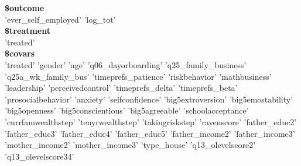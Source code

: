\textbf{\$outcome} \\
 \mbox{'ever\_self\_employed'} \hspace{6pt} \mbox{'log\_tot'}\\


\textbf{\$treatment}\\ 
\mbox{'treated'}
\\

\textbf{\$covars} \\
 \mbox{'treated'} \hspace{6pt}
 \mbox{'gender'} \hspace{6pt}
 \mbox{'age'} \hspace{6pt}
 \mbox{'q06\_dayorboarding'} \hspace{6pt}
 \mbox{'q25\_family\_business'} \hspace{6pt}
 \mbox{'q25a\_wk\_family\_bus'} \hspace{6pt}
 \mbox{'timeprefs\_patience'} \hspace{6pt}
 \mbox{'riskbehavior'} \hspace{6pt}
 \mbox{'mathbusiness'} \hspace{6pt}
 \mbox{'leadership'} \hspace{6pt}
 \mbox{'perceivedcontrol'} \hspace{6pt}
 \mbox{'timeprefs\_delta'} \hspace{6pt}
 \mbox{'timeprefs\_beta'} \hspace{6pt}
 \mbox{'prosocialbehavior'} \hspace{6pt}
 \mbox{'anxiety'} \hspace{6pt}
 \mbox{'selfconfidence'} \hspace{6pt}
 \mbox{'big5extroversion'} \hspace{6pt}
 \mbox{'big5emostability'} \hspace{6pt}
 \mbox{'big5openness'} \hspace{6pt}
 \mbox{'big5conscientious'} \hspace{6pt}
 \mbox{'big5agreeable'} \hspace{6pt}
 \mbox{'schoolacceptance'} \hspace{6pt}
 \mbox{'currfamwealthstep'} \hspace{6pt}
 \mbox{'tenyrwealthstep'} \hspace{6pt}
 \mbox{'takingriskstep'} \hspace{6pt}
 \mbox{'ravenscore'} \hspace{6pt}
 \mbox{'father\_educ2'} \hspace{6pt}
 \mbox{'father\_educ3'} \hspace{6pt}
 \mbox{'father\_educ4'} \hspace{6pt}
 \mbox{'father\_educ5'} \hspace{6pt}
 \mbox{'father\_income2'} \hspace{6pt}
 \mbox{'father\_income3'} \hspace{6pt}
 \mbox{'mother\_income2'} \hspace{6pt}
 \mbox{'mother\_income3'} \hspace{6pt}
 \mbox{'type\_house'} \hspace{6pt}
 \mbox{'q13\_olevelscore2'} \hspace{6pt}
 \mbox{'q13\_olevelscore34'}



